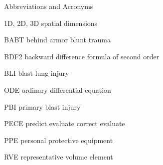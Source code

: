 \noindent 
Abbreviations and Acronyms
\begin{namelist}{\hspace{2.5cm}}
    \item[1D, 2D, 3D] spatial dimensions
    \item[BABT] behind armor blunt trauma
    \item[BDF2] backward difference formula of second order
    \item[BLI] blast lung injury
    \item[ODE] ordinary differential equation
    \item[PBI] primary blast injury
    \item[PECE] predict evaluate correct evaluate
    \item[PPE] personal protective equipment
    \item[RVE] representative volume element
\end{namelist}
